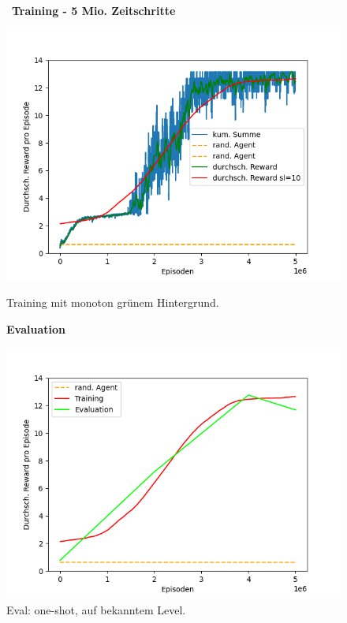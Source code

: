\begin{figure}[htp!]
   \centering
   \captionsetup{width=0.45\linewidth} 
    \begin{minipage}{0.48\linewidth}
        \centering\
        \textbf{Training - 5 Mio. Zeitschritte}\par\medskip
        \includegraphics[scale=0.5]{abb/_graphen/green_5Mio_1lvl_15act_Training}
        \caption{Training mit monoton grünem Hintergrund.}
        \label{fig:grph_green_5Mio_1lvl_15act_Training}
    \end{minipage}
    \centering
    \begin{minipage}{0.48\linewidth}
        \centering
        \textbf{Evaluation}\par\medskip
        \includegraphics[scale=0.5]{abb/_graphen/green_5Mio_1lvl_15act_Training_evalAsTraining} 
        \caption{Eval: one-shot, auf bekanntem Level.}
        \label{fig:grph_green_5Mio_1lvl_15act_Training_evalAsTraining}
    \end{minipage}
\end{figure}

